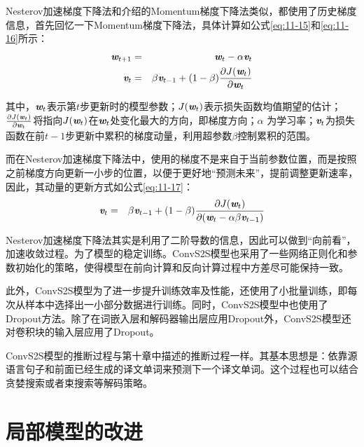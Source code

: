 \parinterval Nesterov加速梯度下降法和{\chapternine}介绍的Momentum梯度下降法类似，都使用了历史梯度信息，首先回忆一下Momentum梯度下降法，具体计算如公式\eqref{eq:11-15}和\eqref{eq:11-16}所示：
\begin{eqnarray}
\textbf{\em w}_{t+1} & = &  \textbf{\em w}_t - \alpha \textbf{\em v}_t \label{eq:11-15} \\
\textbf{\em v}_t & = & \beta \textbf{\em v}_{t-1} + (1-\beta)\frac{\partial J(\textbf{\em w}_t)}{\partial \textbf{\em w}_t}  \label{eq:11-16}
\end{eqnarray}

\noindent 其中，$\textbf{\em w}_t$表示第$t$步更新时的模型参数；$J(\textbf{\em w}_t)$表示损失函数均值期望的估计；$\frac{\partial J(\textbf{\em w}_t)}{\partial \textbf{\em w}_t}$将指向$J(\textbf{\em w}_t)$在$\textbf{\em w}_t$处变化最大的方向，即梯度方向；$\alpha$ 为学习率；$\textbf{\em v}_t$为损失函数在前$t-1$步更新中累积的梯度动量，利用超参数$\beta$控制累积的范围。

\parinterval 而在Nesterov加速梯度下降法中，使用的梯度不是来自于当前参数位置，而是按照之前梯度方向更新一小步的位置，以便于更好地“预测未来”，提前调整更新速率，因此，其动量的更新方式如公式\eqref{eq:11-17}：
\begin{eqnarray}
\textbf{\em v}_t & = & \beta \textbf{\em v}_{t-1} + (1-\beta)\frac{\partial J(\textbf{\em w}_t)}{\partial (\textbf{\em w}_{t} -\alpha \beta \textbf{\em v}_{t-1} )}
\label{eq:11-17}
\end{eqnarray}

\parinterval Nesterov加速梯度下降法其实是利用了二阶导数的信息，因此可以做到“向前看”，加速收敛过程。为了模型的稳定训练。ConvS2S模型也采用了一些网络正则化和参数初始化的策略，使得模型在前向计算和反向计算过程中方差尽可能保持一致。

\parinterval 此外，ConvS2S模型为了进一步提升训练效率及性能，还使用了小批量训练，即每次从样本中选择出一小部分数据进行训练。同时，ConvS2S模型中也使用了Dropout方法。除了在词嵌入层和解码器输出层应用Dropout外，ConvS2S模型还对卷积块的输入层应用了Dropout。

\parinterval ConvS2S模型的推断过程与第十章中描述的推断过程一样。其基本思想是：依靠源语言句子和前面已经生成的译文单词来预测下一个译文单词。这个过程也可以结合贪婪搜索或者束搜索等解码策略。

\sectionnewpage
\section{局部模型的改进}

